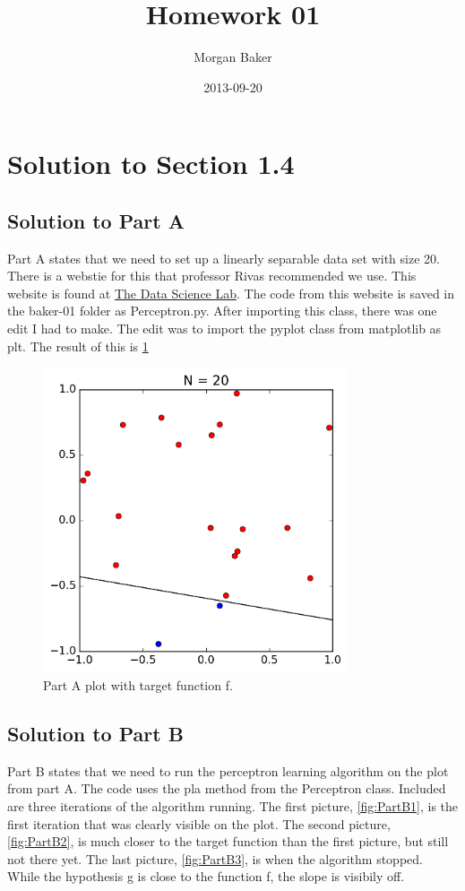 \documentclass[a4paper]{article}
\title{Homework 01}
\date{2013-09-20}
\author{Morgan Baker}
\begin{document}
\lstset{language=Python}
	
\maketitle

\section{Solution to Section 1.4}
\subsection{Solution to Part A}
Part A states that we need to set up a linearly separable data set with size 20.  There is a webstie for this that professor Rivas recommended we use. This website is found at \href{https://datasciencelab.wordpress.com/2014/01/10/machine-learning-classics-the-perceptron/}{The Data Science Lab}. The code from this website is saved in the baker-01 folder as Perceptron.py. After importing this class, there was one edit I had to make. The edit was to import the pyplot class from matplotlib as plt. The result of this is \ref {fig:PartA}


\begin{figure}
  \includegraphics[width=9cm,height=9cm]{p_N20.png}
  \caption{Part A plot with target function f.}
  \label{fig:PartA}
\end{figure}

\subsection{Solution to Part B}
Part B states that we need to run the perceptron learning algorithm on the plot from part A. The code uses the pla method from the Perceptron class. Included are three iterations of the algorithm running. The first picture, \ref{fig:PartB1}, is the first iteration that was clearly visible on the plot. The second picture, \ref{fig:PartB2}, is much closer to the target function than the first picture, but still not there yet. The last picture, \ref{fig:PartB3}, is when the algorithm stopped. While the hypothesis g is close to the function f, the slope is visibily off. 
\end{document}
